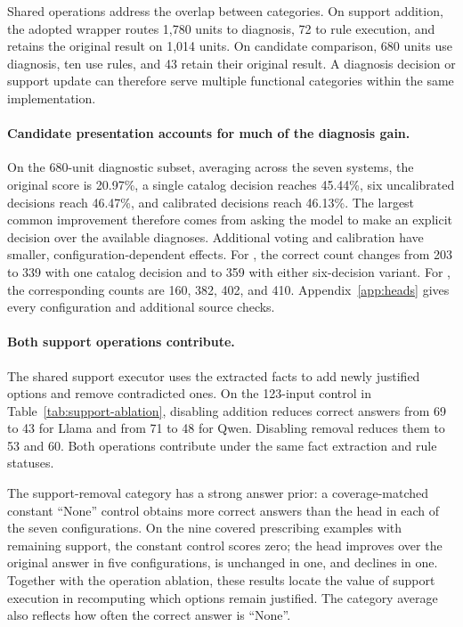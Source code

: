Shared operations address the overlap between categories. On support addition, the adopted wrapper routes 1,780 units to diagnosis, 72 to rule execution, and retains the original result on 1,014 units. On candidate comparison, 680 units use diagnosis, ten use rules, and 43 retain their original result. A diagnosis decision or support update can therefore serve multiple functional categories within the same implementation.

\paragraph{Candidate presentation accounts for much of the diagnosis gain.}
On the 680-unit diagnostic subset, averaging across the seven systems, the original score is 20.97\%, a single catalog decision reaches 45.44\%, six uncalibrated decisions reach 46.47\%, and calibrated decisions reach 46.13\%. The largest common improvement therefore comes from asking the model to make an explicit decision over the available diagnoses. Additional voting and calibration have smaller, configuration-dependent effects. For \sysL{}, the correct count changes from 203 to 339 with one catalog decision and to 359 with either six-decision variant. For \sysQ{}, the corresponding counts are 160, 382, 402, and 410. Appendix~\ref{app:heads} gives every configuration and additional source checks.

\paragraph{Both support operations contribute.}

The shared support executor uses the extracted facts to add newly justified options and remove contradicted ones. On the 123-input control in Table~\ref{tab:support-ablation}, disabling addition reduces correct answers from 69 to 43 for Llama and from 71 to 48 for Qwen. Disabling removal reduces them to 53 and 60. Both operations contribute under the same fact extraction and rule statuses.

The support-removal category has a strong answer prior: a coverage-matched constant ``None'' control obtains more correct answers than the head in each of the seven configurations. On the nine covered prescribing examples with remaining support, the constant control scores zero; the head improves over the original answer in five configurations, is unchanged in one, and declines in one. Together with the operation ablation, these results locate the value of support execution in recomputing which options remain justified. The category average also reflects how often the correct answer is ``None''.

